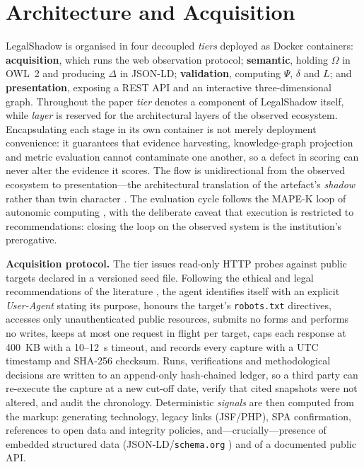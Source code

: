 \documentclass[engproc,proceedingpaper,submit,moreauthors]{Definitions/mdpi}
\begin{document}
\section{Architecture and Acquisition}
\label{sec:arch}

LegalShadow is organised in four decoupled \emph{tiers} deployed as Docker containers: \textbf{acquisition}, which runs the web observation protocol; \textbf{semantic}, holding $\Omega$ in OWL~2 and producing $\Delta$ in JSON-LD; \textbf{validation}, computing $\Psi$, $\delta$ and $L$; and \textbf{presentation}, exposing a REST API and an interactive three-dimensional graph. Throughout the paper \emph{tier} denotes a component of LegalShadow itself, while \emph{layer} is reserved for the architectural layers of the observed ecosystem. Encapsulating each stage in its own container is not merely deployment convenience: it guarantees that evidence harvesting, knowledge-graph projection and metric evaluation cannot contaminate one another, so a defect in scoring can never alter the evidence it scores. The flow is unidirectional from the observed ecosystem to presentation---the architectural translation of the artefact's \emph{shadow} rather than twin character \cite{Kritzinger2018,Sepasgozar2021}. The evaluation cycle follows the MAPE-K loop of autonomic computing \cite{Kephart2003}, with the deliberate caveat that execution is restricted to recommendations: closing the loop on the observed system is the institution's prerogative.

    \textbf{Acquisition protocol.}
    The tier issues read-only HTTP probes against public targets declared in a versioned seed file. Following the ethical and legal recommendations of the literature \cite{Krotov2020}, the agent identifies itself with an explicit \emph{User-Agent} stating its purpose, honours the target's \texttt{robots.txt} directives, accesses only unauthenticated public resources, submits no forms and performs no writes, keeps at most one request in flight per target, caps each response at 400~KB with a 10--12~s timeout, and records every capture with a UTC timestamp and SHA-256 checksum. Runs, verifications and methodological decisions are written to an append-only hash-chained ledger, so a third party can re-execute the capture at a new cut-off date, verify that cited snapshots were not altered, and audit the chronology. Deterministic \emph{signals} are then computed from the markup: generating technology, legacy links (JSF/PHP), SPA confirmation, references to open data and integrity policies, and---crucially---presence of embedded structured data (JSON-LD/\texttt{schema.org} \cite{Guha2016}) and of a documented public API.
\end{document}

